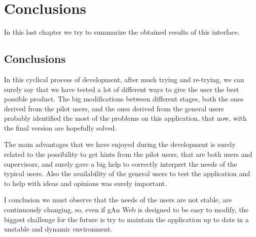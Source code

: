 
\chapter{Conclusions} %

\label{Chapter9} %

In this last chapter we try to summarize the obtained results of this interface.
 
\section{Conclusions}

In this cyclical process of development, after much trying and re-trying, we can surely say that we have tested a lot of different ways to give the user the best possible product. The big modifications between different stages, both the ones derived from the pilot users, and the ones derived from the general users probably identified the most of the problems on this application, that now, with the final version are hopefully solved.

The main advantages that we have enjoyed during the development is surely related to the possibility to get hints from the pilot users, that are both users and supervisors, and surely gave a big help to correctly interpret the needs of the typical users. Also the availability of the general users to test the application and to help with ideas and opinions was surely important.

I conclusion we must observe that the needs of the users are not stable, are continuously changing, so, even if gAn Web is designed to be easy to modify, the biggest challenge for the future is try to maintain the application up to date in a unstable and dynamic environment.  


